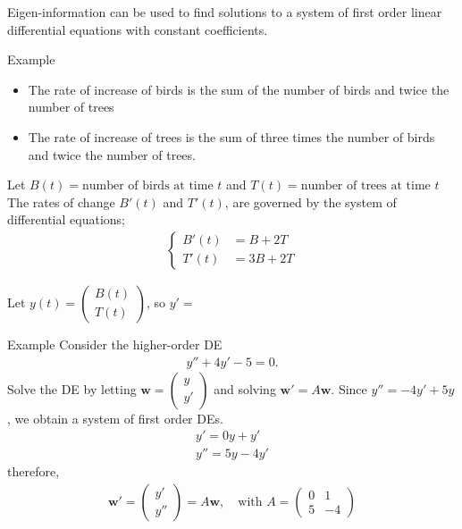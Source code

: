 \documentclass{report}
\renewcommand{\vec}{\mathbf}
\newcommand{\cvec}[1]{ \begin{pmatrix} #1 \end{pmatrix} }
\begin{document}
\begin{enumerate}
			Eigen-information can be used to find solutions to a system of first order linear differential equations with constant coefficients.

			\begin{question}{Example}
				\begin{itemize}
					\item The rate of increase of birds is the sum of the number of birds and twice the number of trees
					\item The rate of increase of trees is the sum of three times the number of birds and twice the number of trees.
				\end{itemize}

				Let $B(t) = \text{number of birds at time $t$}$  and $T(t) = \text{number of trees at time $t$}$ The rates of change $B'(t)$ and $T'(t)$, are governed by the system of differential equations;
				\begin{align*}
					\begin{cases}
						B'(t) &= B + 2T	\\
						T'(t) &= 3B + 2T
					\end{cases}
				\end{align*}

				Let $y(t) = \cvec{B(t)\\T(t)}$, so $y' = $ %
			\end{question}

			\begin{question}{Example}
				Consider the higher-order DE
				\begin{align*}
					y'' + 4y' - 5 = 0.
				\end{align*}
				Solve the DE by letting $\vec{w} = \cvec{y\\y'}$ and solving $\vec{w'} = A \vec{w}$. Since $y'' = -4y' + 5y$, we obtain a system of first order DEs.
				\begin{align*}
					y' = 0y + y'	\\
					y'' = 5y - 4y'
				\end{align*}
				therefore, 
				\begin{align*}
					\vec{w'} = \cvec{y'\\y''} = A \vec{w}, \quad \text{with } A = \cvec{0&1\\5&-4}
				\end{align*}
			\end{question}


\end{enumerate}
\end{document}

